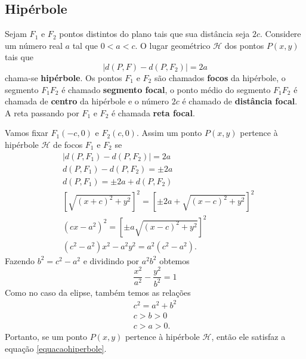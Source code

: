 
\subsection{Hip\'erbole} %
\label{sub:hiperbole}

\begin{definicao}
  Sejam $F_1$ e $F_2$ pontos distintos do plano tais que sua dist\^ancia seja $2c$. Considere um n\'umero real $a$ tal que $0 < a < c$. O lugar geom\'etrico $\mathcal{H}$ dos pontos $P(x,y)$ tais que 
  \begin{equation}\label{equacaohiperbole}
    | d(P,F) - d(P,F_2)| = 2a
  \end{equation}
  chama-se \textbf{hip\'erbole}. Os pontos $F_1$ e $F_2$ s\~ao chamados \textbf{focos} da hip\'erbole, o segmento $F_1F_2$ \'e chamado \textbf{segmento focal}, o ponto m\'edio do segmento $F_1F_2$ \'e chamada de \textbf{centro} da hip\'erbole e o n\'umero $2c$ \'e chamado de \textbf{dist\^ancia focal}. A reta passando por $F_1$ e $F_2$ \'e chamada \textbf{reta focal}.     
\end{definicao}

Vamos fixar $F_1(-c,0)$ e $F_2(c,0)$. Assim um ponto $P(x,y)$ pertence \`a hip\'erbole $\mathcal{H}$ de focos $F_1$ e $F_2$ se
\begin{align*}
  &| d(P,F_1) - d(P,F_2) | = 2a\\
  &d(P,F_1) - d(P,F_2) = \pm 2a\\
  &d(P,F_1) = \pm 2a + d(P,F_2)\\
  &\left[\sqrt{(x + c)^2 + y^2}\right]^2 = \left[\pm 2a + \sqrt{(x - c)^2 + y^2}\right]^2\\
  &(cx - a^2)^2 = \left[\pm a\sqrt{(x - c)^2 + y^2}\right]^2\\
  &(c^2 - a^2)x^2 - a^2y^2 = a^2(c^2 - a^2).
\end{align*}
Fazendo $b^2 = c^2 - a^2$ e dividindo por $a^2b^2$ obtemos
\begin{equation}
  \dfrac{x^2}{a^2} - \dfrac{y^2}{b^2} = 1
\end{equation}
Como no caso da elipse, tamb\'em temos as rela\c{c}\~oes
\begin{align}
  c^2 = a^2 + b^2\\
  c > b > 0\label{pitagorashiperbole}\\
  c > a > 0.
\end{align}
Portanto, se um ponto $P(x,y)$ pertence \`a hip\'erbole $\mathcal{H}$, ent\~ao ele satisfaz a equa\c{c}\~ao \eqref{equacaohiperbole}.

